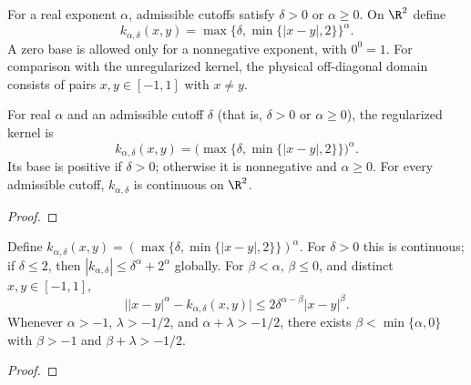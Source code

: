 \begin{supporting}
\begin{definition}
\label{def:power-law-regularized-kernel}
\leanok
For a real exponent $\alpha$, admissible cutoffs satisfy $\delta>0$ or
$\alpha\ge0$. On $\R^2$ define
\[
 k_{\alpha,\delta}(x,y)=\max\{\delta,\min\{|x-y|,2\}\}^{\alpha}.
\]
A zero base is allowed only for a nonnegative exponent, with $0^0=1$.
For comparison with the unregularized kernel, the physical off-diagonal domain
consists of pairs $x,y\in[-1,1]$ with $x\ne y$.
\end{definition}
\begin{theorem}
\label{thm:power-law-regularized-domain}
\leanok
For real $\alpha$ and an admissible cutoff $\delta$ (that is,
$\delta>0$ or $\alpha\ge0$), the regularized kernel is
\[
 k_{\alpha,\delta}(x,y)=\bigl(\max\{\delta,\min\{|x-y|,2\}\}\bigr)^\alpha.
\]
Its base is positive if $\delta>0$; otherwise it is nonnegative and
$\alpha\ge0$. For every admissible cutoff, $k_{\alpha,\delta}$ is continuous
on $\R^2$.
\end{theorem}
\begin{proof}
\leanok
\end{proof}

\begin{theorem}
\label{thm:power-law-regularized-kernel}
\leanok
Define $k_{\alpha,\delta}(x,y)=(\max\{\delta,\min\{|x-y|,2\}\})^\alpha$.
For $\delta>0$ this is continuous; if $\delta\le2$, then
$|k_{\alpha,\delta}|\le\delta^\alpha+2^\alpha$ globally.
For $\beta<\alpha$, $\beta\le0$, and distinct $x,y\in[-1,1]$,
\[
 \bigl||x-y|^\alpha-k_{\alpha,\delta}(x,y)\bigr|
 \le2\delta^{\alpha-\beta}|x-y|^\beta.
\]
Whenever $\alpha>-1$, $\lambda>-1/2$, and $\alpha+\lambda>-1/2$,
there exists $\beta<\min\{\alpha,0\}$ with $\beta>-1$ and
$\beta+\lambda>-1/2$.
\end{theorem}
\begin{proof}
\leanok
\end{proof}


\end{supporting}
